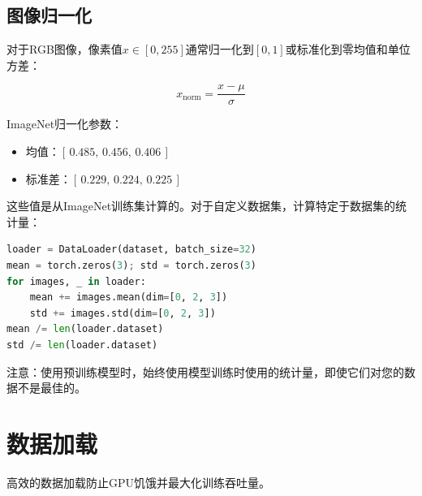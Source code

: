 \subsection{图像归一化}

对于RGB图像，像素值$x \in [0, 255]$通常归一化到$[0, 1]$或标准化到零均值和单位方差：

\begin{equation}
x_{\text{norm}} = \frac{x - \mu}{\sigma}
\end{equation}

ImageNet归一化参数：
\begin{itemize}
    \item 均值：$[\,0.485,\, 0.456,\, 0.406\,]$
    \item 标准差：$[\,0.229,\, 0.224,\, 0.225\,]$
\end{itemize}

这些值是从ImageNet训练集计算的。对于自定义数据集，计算特定于数据集的统计量：

\begin{lstlisting}[language=python]
loader = DataLoader(dataset, batch_size=32)
mean = torch.zeros(3); std = torch.zeros(3)
for images, _ in loader:
    mean += images.mean(dim=[0, 2, 3])
    std += images.std(dim=[0, 2, 3])
mean /= len(loader.dataset)
std /= len(loader.dataset)
\end{lstlisting}

注意：使用预训练模型时，始终使用模型训练时使用的统计量，即使它们对您的数据不是最佳的。

\section{数据加载}

高效的数据加载防止GPU饥饿并最大化训练吞吐量。

